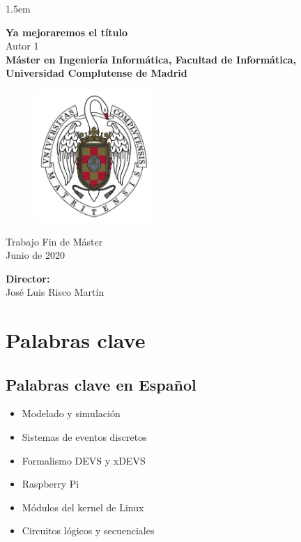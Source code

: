 \documentclass[a4paper,11pt]{book}
\title{\mytitleTFG}
\author{\myauthor}
\date{\today}
\newcommand\mytitleTFG{Ya mejoraremos el título}
\newcommand\myauthor{Autor 1}
\newcommand\myyear{2020}
\begin{document}
\baselineskip 1.5em     %

\titlepage{}
\setlength{\unitlength}{1 cm} %

\begin{center}
\textbf{\LARGE \mytitleTFG}\\[1.25cm]
\LARGE{\myauthor}\\[1.25cm]
\textbf{{\LARGE Máster en Ingeniería Informática, Facultad de Informática, Universidad Complutense de Madrid}\\[0.5cm]}
\begin{figure}[!ht]
\begin{center}
\includegraphics[height=5cm,]{fig/logoucm.png}\\[0.5cm]
\end{center}
\end{figure}

{\LARGE Trabajo Fin de Máster}\\[0.5cm]
{\Large Junio de \myyear}\\[3cm]
\end{center}
\hfill \textbf{\Large Director:}\\

\hfill {\Large José Luis Risco Martín}


\tableofcontents

\chapter*{Palabras clave}

\section*{Palabras clave en Español}
\begin{itemize}
\item Modelado y simulación
\item Sistemas de eventos discretos
\item Formalismo DEVS y xDEVS
\item Raspberry Pi
\item Módulos del kernel de Linux
\item Circuitos lógicos y secuenciales
\end{itemize}
\end{document}
